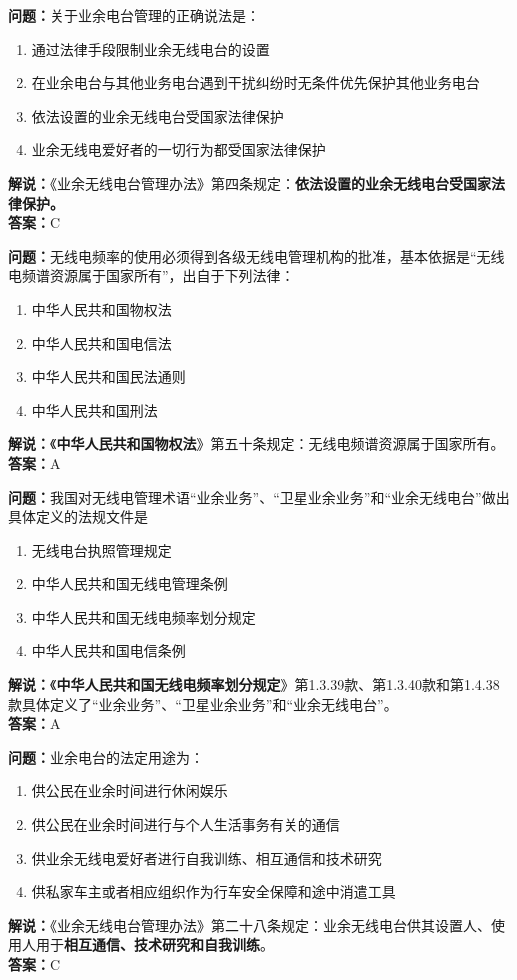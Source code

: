 \bigskip


\noindent\textbf{问题：}关于业余电台管理的正确说法是：
\begin{enumerate}[label=\Alph*), leftmargin=3em]
\item 通过法律手段限制业余无线电台的设置
\item 在业余电台与其他业务电台遇到干扰纠纷时无条件优先保护其他业务电台
\item 依法设置的业余无线电台受国家法律保护
\item 业余无线电爱好者的一切行为都受国家法律保护
\end{enumerate}
\noindent\textbf{解说：}《业余无线电台管理办法》第四条规定：\textbf{依法设置的业余无线电台受国家法律保护。}\\\noindent\textbf{答案：}C

\bigskip


\noindent\textbf{问题：}无线电频率的使用必须得到各级无线电管理机构的批准，基本依据是“无线电频谱资源属于国家所有”，出自于下列法律：
\begin{enumerate}[label=\Alph*), leftmargin=3em]
\item 中华人民共和国物权法
\item 中华人民共和国电信法
\item 中华人民共和国民法通则
\item 中华人民共和国刑法
\end{enumerate}
\noindent\textbf{解说：}《\textbf{中华人民共和国物权法}》第五十条规定：无线电频谱资源属于国家所有。\\\noindent\textbf{答案：}A

\bigskip


\noindent\textbf{问题：}我国对无线电管理术语“业余业务”、“卫星业余业务”和“业余无线电台”做出具体定义的法规文件是
\begin{enumerate}[label=\Alph*), leftmargin=3em]
\item 无线电台执照管理规定
\item 中华人民共和国无线电管理条例
\item 中华人民共和国无线电频率划分规定
\item 中华人民共和国电信条例
\end{enumerate}
\textbf{解说：}《\textbf{中华人民共和国无线电频率划分规定}》第1.3.39款、第1.3.40款和第1.4.38款具体定义了“业余业务”、“卫星业余业务”和“业余无线电台”。\\\noindent\textbf{答案：}A

\bigskip


\noindent\textbf{问题：}业余电台的法定用途为：
\begin{enumerate}[label=\Alph*), leftmargin=3em]
\item 供公民在业余时间进行休闲娱乐
\item 供公民在业余时间进行与个人生活事务有关的通信
\item 供业余无线电爱好者进行自我训练、相互通信和技术研究
\item 供私家车主或者相应组织作为行车安全保障和途中消遣工具
\end{enumerate}
\noindent\textbf{解说：}《业余无线电台管理办法》第二十八条规定：业余无线电台供其设置人、使用人用于\textbf{相互通信、技术研究和自我训练}。\\\noindent\textbf{答案：}C

